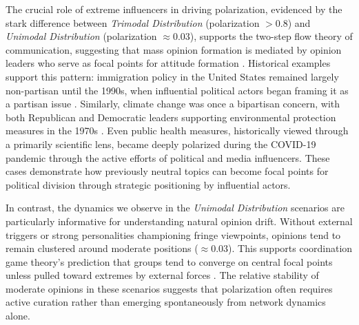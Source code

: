 The crucial role of extreme influencers in driving polarization, evidenced by the stark difference between \emph{Trimodal Distribution} (polarization $> 0.8$) and \emph{Unimodal Distribution} (polarization $\approx 0.03$), supports the two-step flow theory of communication, suggesting that mass opinion formation is mediated by opinion leaders who serve as focal points for attitude formation \citep{katz_personal_2017}. Historical examples support this pattern: immigration policy in the United States remained largely non-partisan until the 1990s, when influential political actors began framing it as a partisan issue \citep{smeltz_are_2022}. Similarly, climate change was once a bipartisan concern, with both Republican and Democratic leaders supporting environmental protection measures in the 1970s \citep{capstick_international_2015}. Even public health measures, historically viewed through a primarily scientific lens, became deeply polarized during the COVID-19 pandemic through the active efforts of political and media influencers. These cases demonstrate how previously neutral topics can become focal points for political division through strategic positioning by influential actors.

In contrast, the dynamics we observe in the \emph{Unimodal Distribution} scenarios are particularly informative for understanding natural opinion drift. Without external triggers or strong personalities championing fringe viewpoints, opinions tend to remain clustered around moderate positions ($\approx 0.03$). This supports coordination game theory's prediction that groups tend to converge on central focal points unless pulled toward extremes by external forces \citep{schelling_the_1980}. The relative stability of moderate opinions in these scenarios suggests that polarization often requires active curation rather than emerging spontaneously from network dynamics alone.

